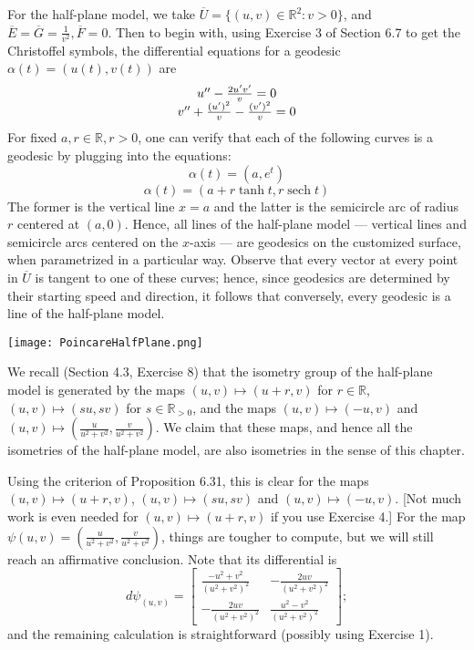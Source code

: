 \documentclass[leqno]{book}
\begin{document}
For the half-plane model, we take $\overline U=\{(u,v)\in\mathbb R^2:v>0\}$, and $\overline E=\overline G=\frac 1{v^2},\overline F=0$.  Then to begin with, using Exercise 3 of Section 6.7 to get the Christoffel symbols, the differential equations for a geodesic $\alpha(t)=(u(t),v(t))$ are
$$\begin{array}{c l}u''-\frac{2u'v'}v=0\\v''+\frac{(u')^2}v-\frac{(v')^2}v=0\end{array}$$
For fixed $a,r\in\mathbb R,r>0$, one can verify that each of the following curves is a geodesic by plugging into the equations:
$$\alpha(t)=(a,e^t)$$
$$\alpha(t)=(a+r\tanh t,r\operatorname{sech}t)$$
The former is the vertical line $x=a$ and the latter is the semicircle arc of radius $r$ centered at $(a,0)$.  Hence, all lines of the half-plane model \---- vertical lines and semicircle arcs centered on the $x$-axis \---- are geodesics on the customized surface, when parametrized in a particular way.  Observe that every vector at every point in $\overline U$ is tangent to one of these curves; hence, since geodesics are determined by their starting speed and direction, it follows that conversely, every geodesic is a line of the half-plane model.
\begin{center}\texttt{[image: PoincareHalfPlane.png]}\end{center}
We recall (Section 4.3, Exercise 8) that the isometry group of the half-plane model is generated by the maps $(u,v)\mapsto(u+r,v)$ for $r\in\mathbb R$, $(u,v)\mapsto(su,sv)$ for $s\in\mathbb R_{>0}$, and the maps $(u,v)\mapsto(-u,v)$ and $(u,v)\mapsto\left(\frac{u}{u^2+v^2},\frac{v}{u^2+v^2}\right)$.  We claim that these maps, and hence all the isometries of the half-plane model, are also isometries in the sense of this chapter.

Using the criterion of Proposition 6.31, this is clear for the maps $(u,v)\mapsto(u+r,v)$, $(u,v)\mapsto(su,sv)$ and $(u,v)\mapsto(-u,v)$.  [Not much work is even needed for $(u,v)\mapsto(u+r,v)$ if you use Exercise 4.]  For the map $\psi(u,v)=\left(\frac u{u^2+v^2},\frac v{u^2+v^2}\right)$, things are tougher to compute, but we will still reach an affirmative conclusion.  Note that its differential is
$$d\psi_{(u,v)}=\begin{bmatrix}\frac{-u^2+v^2}{(u^2+v^2)^2}&-\frac{2uv}{(u^2+v^2)^2}\\-\frac{2uv}{(u^2+v^2)^2}&\frac{u^2-v^2}{(u^2+v^2)^2}\end{bmatrix};$$
and the remaining calculation is straightforward (possibly using Exercise 1).
\end{document}
